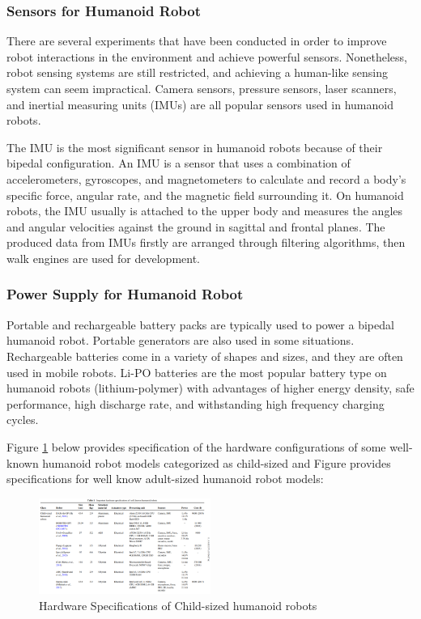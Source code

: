 \documentclass[conference]{IEEEtran}
\begin{document}
 \subsubsection{Sensors for Humanoid Robot}
There are several experiments that have been conducted in order to improve robot interactions in the environment and achieve powerful sensors. Nonetheless, robot sensing systems are still restricted, and achieving a human-like sensing system can seem impractical\autocite{5saeedvand2019comprehensive}. Camera sensors, pressure sensors, laser scanners, and inertial measuring units (IMUs) are all popular sensors used in humanoid robots.

The IMU is the most significant sensor in humanoid robots because of their bipedal configuration. An IMU is a sensor that uses a combination of accelerometers, gyroscopes, and magnetometers to calculate and record a body's specific force, angular rate, and the magnetic field surrounding it. On humanoid robots, the IMU usually is attached to the upper body and measures the angles and angular velocities against the ground in sagittal and frontal planes\autocite{11cho2011online}. The produced data from IMUs firstly are arranged through filtering algorithms, then walk engines are used for development\autocite{5saeedvand2019comprehensive}.

\subsubsection{Power Supply for Humanoid Robot}
Portable and rechargeable battery packs are typically used to power a bipedal humanoid robot. Portable generators are also used in some situations. Rechargeable batteries come in a variety of shapes and sizes, and they are often used in mobile robots. Li-PO batteries are the most popular battery type on humanoid robots (lithium-polymer) with advantages of higher energy density, safe performance, high discharge rate, and withstanding high frequency charging cycles\autocite{5saeedvand2019comprehensive}.

    Figure \ref{prerakfig6} below provides specification of the hardware configurations of some well-known humanoid robot models categorized as child-sized and Figure\autocite{7mejias2017easy} provides specifications for well know adult-sized humanoid robot models\autocite{5saeedvand2019comprehensive}:

\begin{figure}[h]
    \centerline{\includegraphics[width=0.5\textwidth]{prerak_images/Picture8.png}}
    \caption{Hardware Specifications of Child-sized humanoid robots}
\label{prerakfig6}
\end{figure}
\end{document}

